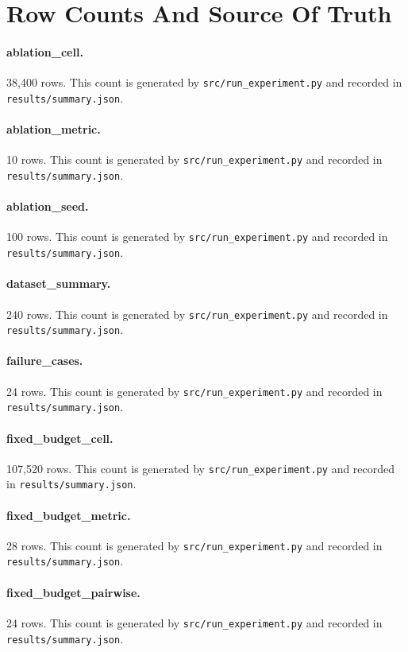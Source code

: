 \documentclass{article}
\begin{document}
\section{Row Counts And Source Of Truth}
\paragraph{ablation\_cell.} 38,400 rows. This count is generated by \texttt{src/run\_experiment.py} and recorded in \texttt{results/summary.json}.
\paragraph{ablation\_metric.} 10 rows. This count is generated by \texttt{src/run\_experiment.py} and recorded in \texttt{results/summary.json}.
\paragraph{ablation\_seed.} 100 rows. This count is generated by \texttt{src/run\_experiment.py} and recorded in \texttt{results/summary.json}.
\paragraph{dataset\_summary.} 240 rows. This count is generated by \texttt{src/run\_experiment.py} and recorded in \texttt{results/summary.json}.
\paragraph{failure\_cases.} 24 rows. This count is generated by \texttt{src/run\_experiment.py} and recorded in \texttt{results/summary.json}.
\paragraph{fixed\_budget\_cell.} 107,520 rows. This count is generated by \texttt{src/run\_experiment.py} and recorded in \texttt{results/summary.json}.
\paragraph{fixed\_budget\_metric.} 28 rows. This count is generated by \texttt{src/run\_experiment.py} and recorded in \texttt{results/summary.json}.
\paragraph{fixed\_budget\_pairwise.} 24 rows. This count is generated by \texttt{src/run\_experiment.py} and recorded in \texttt{results/summary.json}.
\end{document}
